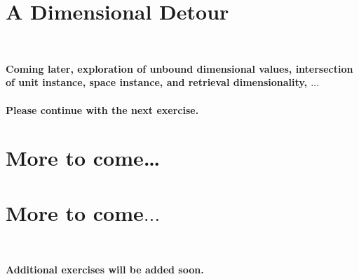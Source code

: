\documentclass[10pt,twoside,english,pdftex]{article}
\begin{document}
\T\markright{}%
\T\pagestyle{plain}
\T\cleardoublepage
\W{}
\T\pagestyle{fancy}
\T\thispagestyle{fancybottom}
\T\renewcommand{\headrulewidth}{0pt}
\section{A Dimensional Detour}
\label{sec:detour}%


\T\medskip
\T\fndocrule\\
\T\begin{center}
\textcolor{darkergray}{\textsf{\textbf{Coming later, exploration of unbound
 dimensional values, intersection of unit instance, space instance, and retrieval
 dimensionality, $\ldots$\\~\\ 
 Please continue with the next exercise.}}}
\T\end{center}
\T\fndocrule



\T\markright{}%
\T\pagestyle{plain}
\T\cleardoublepage
\W{}
\T\pagestyle{fancy}
\T\thispagestyle{fancybottom}
\T\renewcommand{\headrulewidth}{0pt}

\W\section{More to come\ldots}
\T\section{More to come$\ldots$}
\T\medskip
\T\fndocrule\\
\T\begin{center}
\textcolor{darkergray}{\textsf{\textbf{Additional exercises will be 
      added soon.}}}
\T\end{center}
\T\fndocrule

\end{document}
